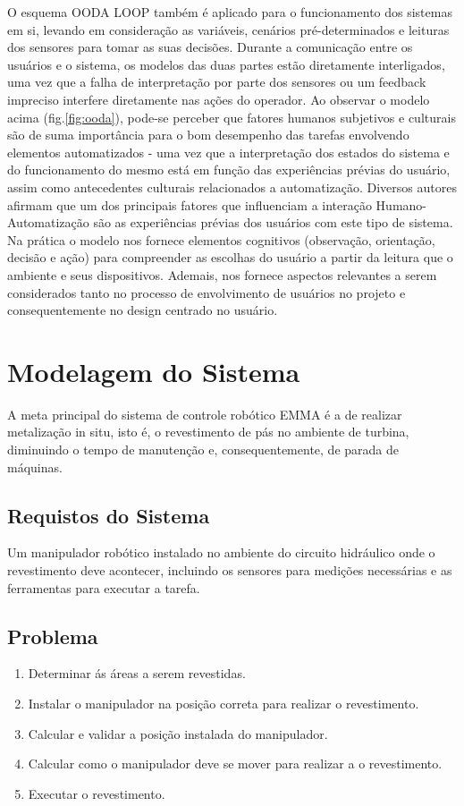 \documentclass[12pt,a4paper]{article}
\begin{document}
O esquema OODA LOOP também é aplicado para o funcionamento dos sistemas em si, levando em consideração as variáveis, cenários pré-determinados e 
leituras dos sensores para tomar as suas decisões. Durante a comunicação entre os usuários e o sistema, os modelos das duas partes estão diretamente 
interligados, uma vez que a falha de interpretação por parte dos sensores ou um feedback impreciso interfere diretamente nas ações do operador.
Ao observar o modelo acima (fig.\ref{fig:ooda}), pode-se perceber que fatores humanos subjetivos e culturais são de suma importância para o bom desempenho 
das tarefas envolvendo elementos automatizados - uma vez que a interpretação dos estados do sistema e do funcionamento do mesmo está em função das 
experiências prévias do usuário, assim como antecedentes culturais relacionados a automatização. Diversos autores 
\cite{Parazuraman2008,degani2003analysis,sheridan2005human} afirmam que um dos
principais fatores que influenciam a interação Humano-Automatização são as experiências prévias dos usuários com este tipo de sistema. Na prática o modelo nos fornece elementos cognitivos (observação, orientação, decisão e ação) para compreender as escolhas do usuário a partir da leitura que o ambiente e seus dispositivos. Ademais, 
nos fornece aspectos relevantes a serem considerados tanto no processo de envolvimento de usuários no projeto e consequentemente no design centrado 
no usuário.


\section{Modelagem do Sistema}

A meta principal do sistema de controle robótico EMMA é a de realizar metalização in situ, isto é, o revestimento de pás no ambiente de turbina, 
diminuindo o tempo de manutenção e, consequentemente, de parada de máquinas.


\subsection{Requistos do Sistema}
Um manipulador robótico instalado no ambiente do circuito hidráulico onde o
revestimento deve acontecer, incluindo os sensores para medições necessárias e as ferramentas para executar a tarefa.

\subsection{Problema}
\begin {enumerate}
  \item Determinar ás áreas a serem revestidas.
  \item Instalar o manipulador na posição correta para realizar o revestimento.
  \item Calcular e validar a posição instalada do manipulador.
  \item Calcular como o manipulador deve se mover para realizar a o
  revestimento.
  \item Executar o revestimento.
\end{enumerate}
\end{document}
